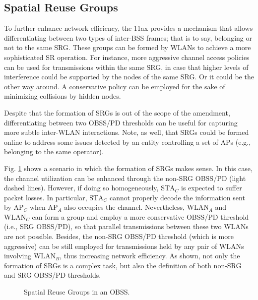 \documentclass[comsoc]{IEEEtran}
\begin{document}
	\subsection{Spatial Reuse Groups}
	\label{section:srg}
	To further enhance network efficiency, the 11ax provides a mechanism that allows differentiating between two types of inter-BSS frames; that is to say, belonging or not to the same SRG. These groups can be formed by WLANs to achieve a more sophisticated SR operation. For instance, more aggressive channel access policies can be used for transmissions within the same SRG, in case that higher levels of interference could be supported by the nodes of the same SRG. Or it could be the other way around. A conservative policy can be employed for the sake of minimizing collisions by hidden nodes. 
	
	Despite that the formation of SRGs is out of the scope of the amendment, differentiating between two OBSS/PD thresholds can be useful for capturing more subtle inter-WLAN interactions. Note, as well, that SRGs could be formed online to address some issues detected by an entity controlling a set of APs (e.g., belonging to the same operator).
	
	Fig. \ref{fig:fig_6} shows a scenario in which the formation of SRGs makes sense. In this case, the channel utilization can be enhanced through the non-SRG OBSS/PD (light dashed lines). However, if doing so homogeneously, $\text{STA}_C$ is expected to suffer packet losses. In particular, $\text{STA}_C$ cannot properly decode the information sent by $\text{AP}_C$ when $\text{AP}_A$ also occupies the channel. Nevertheless, $\text{WLAN}_A$ and $\text{WLAN}_C$ can form a group and employ a more conservative OBSS/PD threshold (i.e., SRG OBSS/PD), so that parallel transmissions between these two WLANs are not possible. Besides, the non-SRG OBSS/PD threshold (which is more aggressive) can be still employed for transmissions held by any pair of WLANs involving $\text{WLAN}_B$, thus increasing network efficiency. As shown, not only the formation of SRGs is a complex task, but also the definition of both non-SRG and SRG OBSS/PD thresholds.
	
	\begin{figure}[ht!]
		\centering
		\caption{Spatial Reuse Groups in an OBSS.}
		\label{fig:fig_6}
	\end{figure}
	
\end{document}
